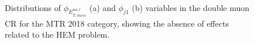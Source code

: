\begin{figure}[htbp]
  \centering
    \\
  \caption{Distributions of $\phi_{E_{T,miss}^{no,l}}$ (a) and $\phi_{j1}$ (b) variables in the double muon CR for the MTR 2018 category, showing the absence of effects related to the HEM problem. }
  \label{app:Zmumu_noHEM}
\end{figure}


